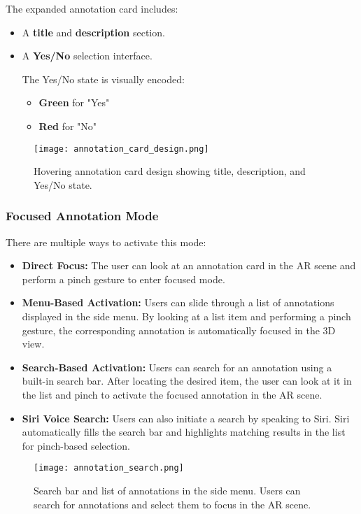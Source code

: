 The expanded annotation card includes:
\begin{itemize}
    \item A \textbf{title} and \textbf{description} section.
    \item A \textbf{Yes/No} selection interface.
    
    The Yes/No state is visually encoded:
    \begin{itemize}
        \item \textbf{Green} for "Yes"
        \item \textbf{Red} for "No"
    \end{itemize}
\end{itemize}

\begin{figure}[H]
            \centering
            \texttt{[image: annotation\_card\_design.png]}
            \caption{Hovering annotation card design showing title, description, and Yes/No state.}
            \label{fig:annotation_card_design}
        \end{figure}

\subsubsection{Focused Annotation Mode}

There are multiple ways to activate this mode:
\begin{itemize}
    \item \textbf{Direct Focus:} The user can look at an annotation card in the AR scene and perform a pinch gesture to enter focused mode.
    \item \textbf{Menu-Based Activation:} Users can slide through a list of annotations displayed in the side menu. By looking at a list item and performing a pinch gesture, the corresponding annotation is automatically focused in the 3D view.
    \item \textbf{Search-Based Activation:} Users can search for an annotation using a built-in search bar. After locating the desired item, the user can look at it in the list and pinch to activate the focused annotation in the AR scene.
    \item \textbf{Siri Voice Search:} Users can also initiate a search by speaking to Siri. Siri automatically fills the search bar and highlights matching results in the list for pinch-based selection.
\end{itemize}

\begin{figure}[H]
            \centering
            \texttt{[image: annotation\_search.png]}
            \caption{\centering Search bar and list of annotations in the side menu. Users can search for annotations and select them to focus in the AR scene.}
            \label{fig:annotation_search}
        \end{figure}

